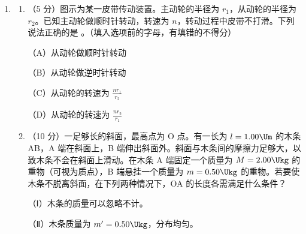 \documentclass[\gkver]{gaokaozhenti}
\begin{document}
\begin{enumerate}
\item
\begin{enumerate}
	\item
	（5 分）图示为某一皮带传动装置。主动轮的半径为 $r_{1}$，从动轮的半径为 $r_{2}$。已知主动轮做顺时针转动，转速为 $n$，转动过程中皮带不打滑。下列说法正确的是 \tkanswer[1.0cm]{}。（填入选项前的字母，有填错的不得分）
	
	
	（A）从动轮做顺时针转动
	
	（B）从动轮做逆时针转动
	
	（C）从动轮的转速为 $\frac{nr_{1}}{r_{2}}$
	
	（D）从动轮的转速为 $\frac{nr_{2}}{r_{1}}$
	
	\item
	（10 分）一足够长的斜面，最高点为 O 点。有一长为 $l=1.00\Um$ 的木条 AB，A 端在斜面上，B 端伸出斜面外。斜面与木条间的摩擦力足够大，以致木条不会在斜面上滑动。在木条 A 端固定一个质量为 $M=2.00\Ukg$ 的重物（可视为质点），B 端悬挂一个质量为 $m=0.50\Ukg$ 的重物。若要使木条不脱离斜面，在下列两种情况下，OA 的长度各需满足什么条件？
	
	
	（Ⅰ）木条的质量可以忽略不计。
	
	（Ⅱ）木条质量为 $m'=0.50\Ukg$，分布均匀。
\end{enumerate}


\end{enumerate}
\end{document}
